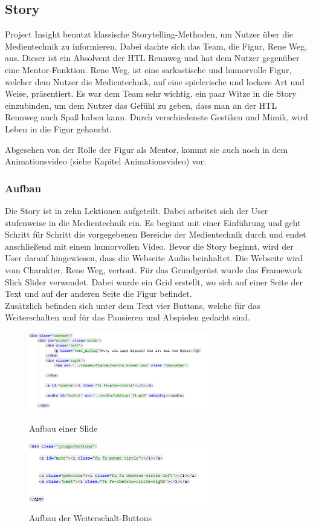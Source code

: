 \subsection{Story}
Project Insight benutzt klassische Storytelling-Methoden, um Nutzer über die Medientechnik zu informieren. Dabei dachte sich das Team, die Figur, Rene Weg, aus. Dieser ist ein Absolvent der HTL Rennweg und hat dem Nutzer gegenüber eine Mentor-Funktion. Rene Weg, ist eine sarkastische und humorvolle Figur, welcher dem Nutzer die Medientechnik, auf eine spielerische und lockere Art und Weise, präsentiert. Es war dem Team sehr wichtig, ein paar Witze in die Story einzubinden, um dem Nutzer das Gefühl zu geben, dass man an der HTL Rennweg auch Spaß haben kann. Durch verschiedenste Gestiken und Mimik, wird Leben in die Figur gehaucht. 

Abgesehen von der Rolle der Figur als Mentor, kommt sie auch noch in dem Animationsvideo (siehe Kapitel Animationsvideo) vor. 

\subsubsection{Aufbau}
Die Story ist in zehn Lektionen aufgeteilt. Dabei arbeitet sich der User stufenweise in die Medientechnik ein. Es beginnt mit einer Einführung und geht Schritt für Schritt die vorgegebenen Bereiche der Medientechnik durch und endet anschließend mit einem humorvollen Video. Bevor die Story beginnt, wird der User darauf hingewiesen, dass die Webseite Audio beinhaltet. Die Webseite wird vom Charakter, Rene Weg, vertont. 
Für das Grundgerüst wurde das Framework Slick Slider verwendet. Dabei wurde ein Grid erstellt, wo sich auf einer Seite der Text und auf der anderen Seite die Figur befindet. 
\\

Zusätzlich befinden sich unter dem Text vier Buttons, welche für das Weiterschalten und für das Pausieren und Abspielen gedacht sind. 


\begin{figure}[H] 
  \centering
     \includegraphics[width=0.7\textwidth]{webseite_abb4.png}
  \caption{Aufbau einer Slide}
  
  \centering
  	\includegraphics[width=0.7\textwidth]{webseite_abb5.png}
  \caption{Aufbau der Weiterschalt-Buttons}

\end{figure}

